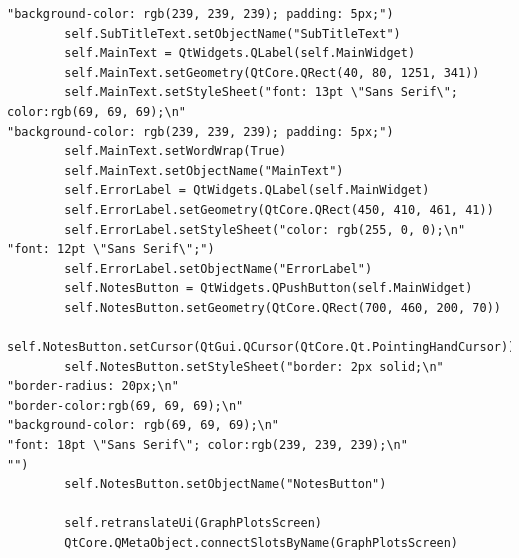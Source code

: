 \documentclass[12pt]{article}
\begin{document}
\begin{lstlisting}
"background-color: rgb(239, 239, 239); padding: 5px;")
        self.SubTitleText.setObjectName("SubTitleText")
        self.MainText = QtWidgets.QLabel(self.MainWidget)
        self.MainText.setGeometry(QtCore.QRect(40, 80, 1251, 341))
        self.MainText.setStyleSheet("font: 13pt \"Sans Serif\"; color:rgb(69, 69, 69);\n"
"background-color: rgb(239, 239, 239); padding: 5px;")
        self.MainText.setWordWrap(True)
        self.MainText.setObjectName("MainText")
        self.ErrorLabel = QtWidgets.QLabel(self.MainWidget)
        self.ErrorLabel.setGeometry(QtCore.QRect(450, 410, 461, 41))
        self.ErrorLabel.setStyleSheet("color: rgb(255, 0, 0);\n"
"font: 12pt \"Sans Serif\";")
        self.ErrorLabel.setObjectName("ErrorLabel")
        self.NotesButton = QtWidgets.QPushButton(self.MainWidget)
        self.NotesButton.setGeometry(QtCore.QRect(700, 460, 200, 70))
        self.NotesButton.setCursor(QtGui.QCursor(QtCore.Qt.PointingHandCursor))
        self.NotesButton.setStyleSheet("border: 2px solid;\n"
"border-radius: 20px;\n"
"border-color:rgb(69, 69, 69);\n"
"background-color: rgb(69, 69, 69);\n"
"font: 18pt \"Sans Serif\"; color:rgb(239, 239, 239);\n"
"")
        self.NotesButton.setObjectName("NotesButton")

        self.retranslateUi(GraphPlotsScreen)
        QtCore.QMetaObject.connectSlotsByName(GraphPlotsScreen)


\end{lstlisting}
\end{document}
